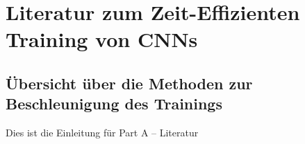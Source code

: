 \part{Literatur zum Zeit-Effizienten Training von CNNs}
\chapter{Übersicht über die Methoden zur Beschleunigung des Trainings}
Dies ist die Einleitung für Part A -- Literatur
